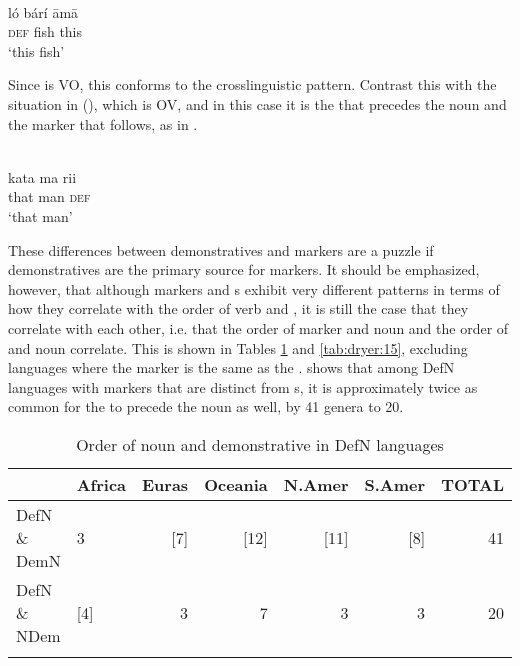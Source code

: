 \documentclass[output=paper]{langsci/langscibook}
\begin{document}
\ea\label{ex:dryer:41}
\\
\gll   ló   bárí   āmā \\
       \textsc{def}   fish   this \\
\glt   ‘this fish’
\z

\noindent Since  is VO, this conforms to the crosslinguistic pattern. Contrast this with the situation in  (), which is OV, and in this case it is the  that precedes the noun and the  marker that follows, as in .

\ea\label{ex:dryer:42}
\\
\gll   kata  ma  rii\\
       that  man  \textsc{def}\\
\glt   ‘that man’
\z

These differences between demonstratives and  markers are a puzzle if demonstratives are the primary  source for  markers. It should be emphasized, however, that although  markers and s exhibit very different patterns in terms of how they correlate with the order of verb and , it is still the case that they correlate with each other, i.e. that the order of  marker and noun and the order of  and noun correlate. This is shown in Tables \ref{tab:dryer:14} and \ref{tab:dryer:15}, excluding languages where the  marker is the same as the .  shows that among DefN languages with  markers that are distinct from s, it is approximately twice as common for the  to precede the noun as well, by 41 genera to 20.

\begin{table}
\begin{tabularx}{\textwidth}{Xlrrrrr}
\lsptoprule
& \bfseries Africa & \bfseries Euras & \bfseries Oceania & \bfseries N.Amer & \bfseries S.Amer & \bfseries TOTAL\\
\midrule
DefN \& DemN & 3 & [7] & [12] & [11] & [8] & 41\\
DefN \& NDem & [4] & 3 & 7 & 3 & 3 & 20\\
\lspbottomrule
\end{tabularx}
\caption{\label{tab:dryer:14}Order of noun and demonstrative in DefN languages}
\end{table}
\end{document}
